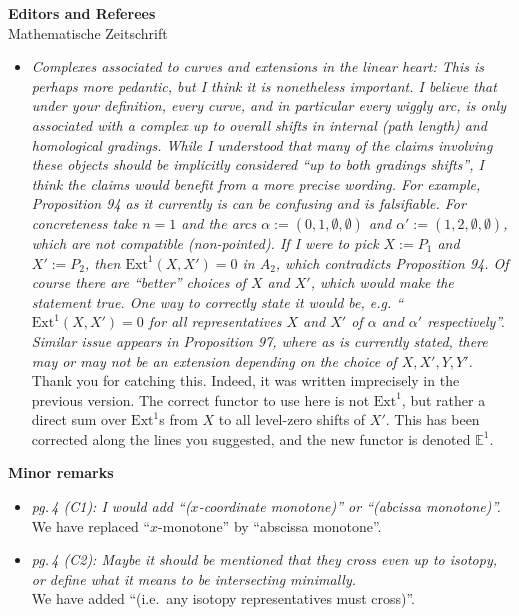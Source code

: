 \documentclass{letter}
\begin{document}
\begin{letter}{{\bf Editors and Referees} \\ Mathematische Zeitschrift}
\begin{itemize}
\item \textsl{\color{gray} Complexes associated to curves and extensions in the linear heart: This is perhaps more pedantic, but I think it is nonetheless important. I believe that under your definition, every curve, and in particular every wiggly arc, is only associated with a complex up to overall shifts in internal (path length) and homological gradings. While I understood that many of the claims involving these objects should be implicitly considered “up to both gradings shifts”, I think the claims would benefit from a more precise wording. For example, Proposition 94 as it currently is can be confusing and is falsifiable. For concreteness take $n = 1$ and the arcs $\alpha := (0, 1, \emptyset, \emptyset)$ and $\alpha' := (1, 2, \emptyset, \emptyset)$, which are not compatible (non-pointed). If I were to pick $X := P_1$ and $X' := P_2$, then $\mathrm{Ext}^1(X, X') = 0$ in $A_2$, which contradicts Proposition 94. Of course there are ``better'' choices of $X$ and $X'$, which would make the statement true. One way to correctly state it would be, e.g. ``$\mathrm{Ext}^1(X,X') = 0$ for all representatives $X$ and $X'$ of $\alpha$ and $\alpha'$ respectively''. Similar issue appears in Proposition 97, where as is currently stated, there may or may not be an extension depending on the choice of $X, X', Y, Y'$.} \\
  Thank you for catching this. Indeed, it was written imprecisely in the previous version.
  The correct functor to use here is not \(\mathrm{Ext}^1\), but rather a direct sum over \(\mathrm{Ext}^1\)s from \(X\) to all level-zero shifts of \(X'\).
  This has been corrected along the lines you suggested, and the new functor is denoted \(\mathbb{E}^1\).

\end{itemize}

{\bf Minor remarks}

\begin{itemize}
\item \textsl{\color{gray} pg.\,4 (C1): I would add ``($x$-coordinate monotone)'' or ``(abcissa monotone)''.} \\
We have replaced ``$x$-monotone'' by ``abscissa monotone''.

\item \textsl{\color{gray} pg.\,4 (C2): Maybe it should be mentioned that they cross even up to isotopy, or define what it means to be intersecting minimally.} \\
We have added ``(i.e.~any isotopy representatives must cross)''.


\end{itemize}
\end{letter}
\end{document}
